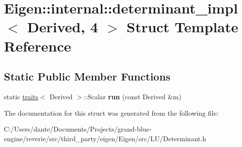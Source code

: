 \hypertarget{struct_eigen_1_1internal_1_1determinant__impl_3_01_derived_00_014_01_4}{}\section{Eigen\+::internal\+::determinant\+\_\+impl$<$ Derived, 4 $>$ Struct Template Reference}
\label{struct_eigen_1_1internal_1_1determinant__impl_3_01_derived_00_014_01_4}
\subsection*{Static Public Member Functions}
\begin{DoxyCompactItemize}
\item 
\mbox{\label{struct_eigen_1_1internal_1_1determinant__impl_3_01_derived_00_014_01_4_adb5a6a0cdda4664a8dd38c348411ee03}} 
static \mbox{\hyperlink{struct_eigen_1_1internal_1_1traits}{traits}}$<$ Derived $>$\+::Scalar {\bfseries run} (const Derived \&m)
\end{DoxyCompactItemize}


The documentation for this struct was generated from the following file\+:\begin{DoxyCompactItemize}
\item 
C\+:/\+Users/dante/\+Documents/\+Projects/grand-\/blue-\/engine/reverie/src/third\+\_\+party/eigen/\+Eigen/src/\+L\+U/Determinant.\+h\end{DoxyCompactItemize}
